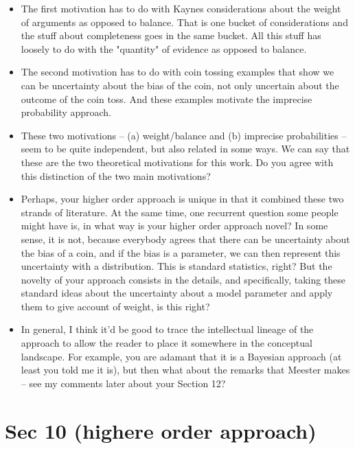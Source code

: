 \documentclass[
  10pt,
  dvipsnames,enabledeprecatedfontcommands]{scrartcl}
\begin{document}
\begin{itemize}
\item The first motivation has to do with Kaynes considerations about the weight of arguments as opposed to balance. That is one bucket of considerations and the stuff about completeness goes in the same bucket. All this stuff has loosely to do with the "quantity" of evidence as opposed to balance.

\item The second motivation has to do with coin tossing examples that show we can be uncertainty about the bias of the coin, not only uncertain about the outcome of the coin toss. And these examples motivate the imprecise probability approach. 

\item These two motivations -- (a) weight/balance and (b) imprecise probabilities -- seem to be quite independent, but also related in some ways. We can say that these are the two theoretical motivations for this work. Do you agree with this distinction of the two main motivations? 

\item Perhaps, your higher order approach is unique in that it combined these two strands of literature. At the same time, one recurrent question some people might have is, in what way is your higher order approach novel? In some sense, it is not, because everybody agrees that there can be uncertainty about the bias of a coin, and if the bias is a parameter, we can then represent this uncertainty with a distribution. This is standard statistics, right? But the novelty of your approach  consists in the details, and specifically, taking these standard ideas about the uncertainty about a model parameter and apply them to give account of weight, is this right? 

\item In general, I think it'd be good to trace the intellectual lineage of the approach to allow the reader to place it somewhere in the conceptual landscape.  For example, you are adamant that it is a Bayesian approach (at least you told me it is), but then what about the remarks that Meester makes -- see my comments later about your Section 12?





\end{itemize}

\hypertarget{sec-10-highere-order-approach}{%
\section{Sec 10 (highere order
approach)}\label{sec-10-highere-order-approach}}
\end{document}
